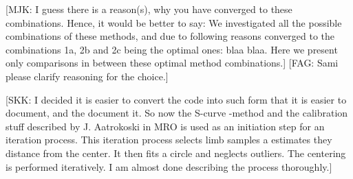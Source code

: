 \documentclass{aa}
\newcommand{\fag}[1]{\textcolor{midpurple}{[FAG: #1]}} %
\newcommand{\mjk}[1]{\textcolor{midgreen}{[MJK: #1]}} %
\newcommand{\skk}[1]{\textcolor{midorange}{[SKK: #1]}} %
\begin{document}
  \mjk{I guess there is a reason(s), why you have converged to these combinations. Hence, it would be better to say: We investigated all the possible combinations of these methods, and due to following reasons converged to the combinations 1a, 2b and 2c being the optimal ones: blaa blaa. Here we present only comparisons in between these optimal method combinations.}
  \fag{Sami please clarify reasoning for the choice.}

    \skk{I decided it is easier to convert the code into such form that it is easier to document, and the document it. 
    So now the S-curve -method and the calibration stuff described by J. Aatrokoski in MRO is used as an initiation step 
    for an iteration process. This iteration process selects limb samples a estimates they distance from the center. It 
    then fits a circle and neglects outliers. The centering is performed iteratively. I am almost done describing the 
    process thoroughly.}
\end{document}
